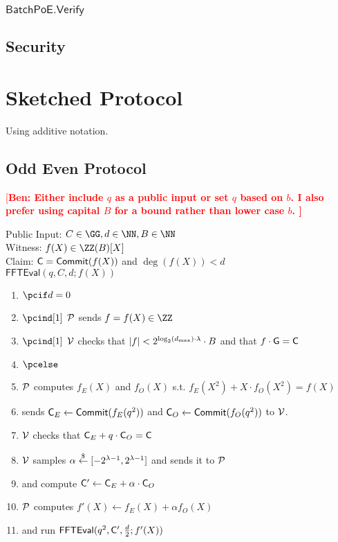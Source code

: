 \documentclass[11pt]{article}
\theoremstyle{Definition}
\newcommand{\ben}[1]{{\textcolor{red}{[\bf Ben: #1]}}}
\newcommand{\ben}[1]{}
\begin{document}
\subsubsection{$\mathsf{BatchPoE.Verify}$}

\subsection{Security}

\section{Sketched Protocol}
Using additive notation. 

\subsection{Odd Even Protocol}
\ben{Either include $q$ as a public input or set $q$ based on $b$. I also prefer using capital $B$ for a bound rather than lower case $b$. } 

\label{sec:oddeven}
\begin{mdframed}
Public Input: $C\in \GG, d \in \NN, \Bound\in \NN$\\
Witness: $f(X) \in \ZZ(\Bound)[X]$ \\
Claim: $\mathsf{C} =\textsf{{Commit}}(f(X))$ and $\deg(f(X))<d$	\\
$\textsf{FFTEval}(q,C,d;f(X))$
\begin{enumerate}[nolistsep]
		\item $\pcif d=0$
		\item $\pcind[1]$ $\mathcal{P}$ sends $f=f(X) \in \ZZ$
		\item $\pcind[1]$ $\mathcal{V}$ checks that $|f|<2^{\log_2(d_{\max}) \cdot \lambda} \cdot B$ and that $f \cdot \mathsf{G}=\mathsf{C}$
		\item $\pcelse$
		\item $\mathcal{P}$ computes $f_E(X)$ and $f_O(X)$ s.t. $f_E(X^2)+X \cdot f_O(X^2)=f(X)$ 
		\item \prover sends $\mathsf{C}_E\gets \textsf{{Commit}}(f_E(q^2))$ and $\mathsf{C}_O\gets \textsf{{Commit}}(f_O(q^2))$ to $\mathcal{V}$. 
		\item $\mathcal{V}$ checks that $\mathsf{C}_E+ q\cdot \mathsf{C}_O=\mathsf{C}$ 
		\item $\mathcal{V}$ samples $\alpha \overset{\$}{\gets} [-2^{\lambda-1},2^{\lambda-1}]$ and sends it to $\mathcal{P}$
		\item \prover and \verifier compute $\mathsf{C}'\gets \mathsf{C}_E+\alpha \cdot \mathsf{C}_O$
		\item $\mathcal{P}$ computes $f'(X)\gets f_E(X)+\alpha f_O(X)$
		\item \prover and \verifier run $\textsf{FFTEval}(q^2,\mathsf{C}',\frac{d}{2};f'(X))$
	\end{enumerate}
\end{mdframed}
\end{document}
